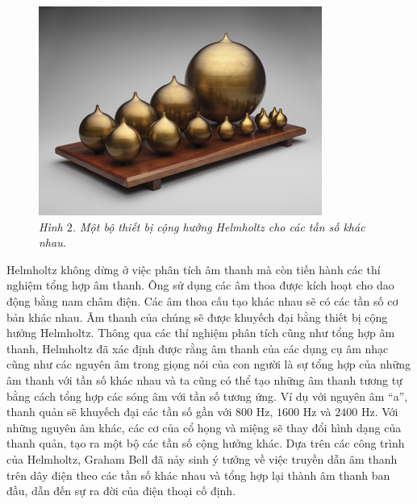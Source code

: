 \begin{multicols}{2}
	\begin{figure}[H]
		\centering
		\vspace*{-5pt}
		\captionsetup{labelformat= empty, justification=centering}
		\includegraphics[width=1\linewidth]{4}
		\caption{\small\textit{\color{timhieukhoahoc}Hình $2$. Một bộ thiết bị cộng hưởng Helmholtz cho các tần số khác nhau.}}
		\vspace*{-10pt}
	\end{figure}
	Helmholtz không dừng ở việc phân tích âm thanh mà còn tiến hành các thí nghiệm tổng hợp âm thanh. Ông sử dụng các âm thoa được kích hoạt cho dao động bằng nam châm điện. Các âm thoa cấu tạo khác nhau sẽ có các tần số cơ bản khác nhau. Âm thanh của chúng sẽ được khuyếch đại bằng thiết bị cộng hưởng Helmholtz. Thông qua các thí nghiệm phân tích cũng như tổng hợp âm thanh, Helmholtz đã xác định được rằng âm thanh của các dụng cụ âm nhạc cũng như các nguyên âm trong giọng nói của con người là sự tổng hợp của những âm thanh với tần số khác nhau và ta cũng có thể tạo những âm thanh tương tự bằng cách tổng hợp các sóng âm với tần số tương ứng. Ví dụ với nguyên âm ``a”, thanh quản sẽ khuyếch đại các tần số gần với $800$ Hz, $1600$ Hz và $2400$ Hz. Với những nguyên âm khác, các cơ của cổ họng và miệng sẽ thay đổi hình dạng của thanh quản, tạo ra một bộ các tần số cộng hưởng khác. Dựa trên các công trình của Helmholtz, Graham Bell đã nảy sinh ý tưởng về việc truyền dẫn âm thanh trên dây điện theo các tần số khác nhau và tổng hợp lại thành âm thanh ban đầu, dẫn đến sự ra đời của điện thoại cố định.
	\begin{figure}[H]
		\centering
		\vspace*{-5pt}

\end{figure}
\end{multicols}
